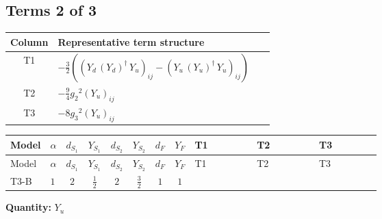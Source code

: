\documentclass[8pt]{article}
\begin{document}
\begin{landscape}
\subsection*{Terms 2 of 3}
\begin{center}
\begin{tabular}{@{}c >{\raggedright\arraybackslash}p{0.82\linewidth}@{}}
\toprule
Column & Representative term structure \\
\midrule
T1 & \(\displaystyle -\frac{3}{2} (\left({Y_d}\,\left({Y_d}\right)^{\dagger}\,{Y_u}\right)_{ij}-\left({Y_u}\,\left({Y_u}\right)^{\dagger}\,{Y_u}\right)_{ij})\) \\
\midrule
T2 & \(\displaystyle -\frac{9}{4} {g_2}^2 \left({Y_u}\right)_{ij}\) \\
\midrule
T3 & \(\displaystyle -8 {g_3}^2 \left({Y_u}\right)_{ij}\) \\
\midrule
\bottomrule
\end{tabular}
\end{center}
\smallskip
\tiny
\begin{longtable}{@{}llcccccc >{\raggedright\arraybackslash}p{0.21\linewidth} >{\raggedright\arraybackslash}p{0.21\linewidth} >{\raggedright\arraybackslash}p{0.21\linewidth}@{}}
\toprule
Model & $\alpha$ & $d_{S_1}$ & $Y_{S_1}$ & $d_{S_2}$ & $Y_{S_2}$ & $d_F$ & $Y_F$ & T1 & T2 & T3 \\
\midrule
\endfirsthead
\toprule
Model & $\alpha$ & $d_{S_1}$ & $Y_{S_1}$ & $d_{S_2}$ & $Y_{S_2}$ & $d_F$ & $Y_F$ & T1 & T2 & T3 \\
\midrule
\endhead
T3-B & $1$ & $2$ & $\frac{1}{2}$ & $2$ & $\frac{3}{2}$ & $1$ & $1$ & \scriptsize\adjustbox{max width=\linewidth}{$\begin{gathered} -\frac{3}{2} (\left({Y_d}\,\left({Y_d}\right)^{\dagger}\,{Y_u}\right)_{ij}-\left({Y_u}\,\left({Y_u}\right)^{\dagger}\,{Y_u}\right)_{ij})\end{gathered}$} & \scriptsize\adjustbox{max width=\linewidth}{$\begin{gathered} -\frac{9}{4} {g_2}^2 \left({Y_u}\right)_{ij}\end{gathered}$} & \scriptsize\adjustbox{max width=\linewidth}{$\begin{gathered} -8 {g_3}^2 \left({Y_u}\right)_{ij}\end{gathered}$} \\
\midrule
\bottomrule
\end{longtable}
\clearpage
\noindent\textbf{Quantity: }$Y_u$\par\smallskip

\end{landscape}
\end{document}
